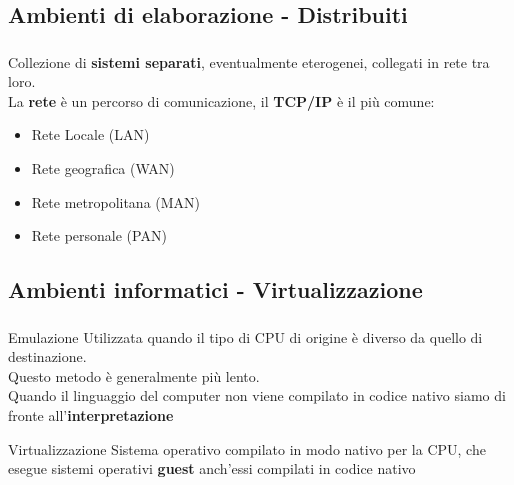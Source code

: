 \documentclass{beamer}
\newenvironment{mainframe}{
	\begin{frame}
		\frametitle{\insertsubsection}
		\framesubtitle{\insertsection}
	}{
	\end{frame}
}
\begin{document}
\subsection{Ambienti di elaborazione - Distribuiti}
\begin{mainframe}
	Collezione di \textbf{sistemi separati}, eventualmente eterogenei, collegati in rete tra loro.\\
	La \textbf{rete} è un percorso di comunicazione, il \textbf{TCP/IP} è il più comune:
	\begin{itemize}
		\item Rete Locale (LAN)
		\item Rete geografica (WAN)
		\item Rete metropolitana (MAN)
		\item Rete personale (PAN)
	\end{itemize}
\end{mainframe}
\subsection{Ambienti informatici - Virtualizzazione}
\begin{mainframe}
	\begin{block}{Emulazione}
		Utilizzata quando il tipo di CPU di origine è diverso da quello di destinazione.\\
		Questo metodo è generalmente più lento.\\
		Quando il linguaggio del computer non viene compilato in codice nativo siamo di fronte all'\textbf{interpretazione}
	\end{block}
	\begin{block}{Virtualizzazione}
		Sistema operativo compilato in modo nativo per la CPU, che esegue sistemi operativi \textbf{guest} anch'essi compilati in codice nativo
	\end{block}
\end{mainframe}
\end{document}
